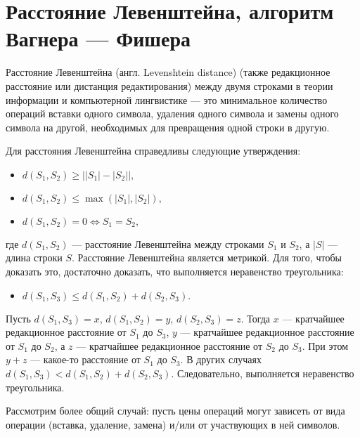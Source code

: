 \section{Расстояние Левенштейна, алгоритм Вагнера --- Фишера}

\begin{definition}
    Расстояние Левенштейна (англ. Levenshtein distance) (также редакционное расстояние или дистанция редактирования) между двумя строками в теории информации и компьютерной лингвистике --- это минимальное количество операций вставки одного символа, удаления одного символа и замены одного символа на другой, необходимых для превращения одной строки в другую.
\end{definition}

Для расстояния Левенштейна справедливы следующие утверждения:

\begin{itemize}
    \item $d(S_1,S_2) \ge \big||S_1|-|S_2| \big|,$
    \item $d(S_1,S_2) \le \max(|S_1|,|S_2|),$
    \item $d(S_1,S_2)=0 \Leftrightarrow S_1=S_2,$
\end{itemize}

где $d(S_1,S_2)$ --- расстояние Левенштейна между строками $S_1$ и $S_2$, а $|S|$ --- длина строки $S$.
Расстояние Левенштейна является метрикой. Для того, чтобы доказать это, достаточно доказать, что выполняется неравенство треугольника:
\begin{itemize}
    \item $d(S_1,S_3) \le d(S_1,S_2) + d(S_2,S_3).$
\end{itemize}

Пусть $d(S_1,S_3) = x$, $d(S_1,S_2) = y$, $d(S_2,S_3) = z$.
Тогда $x$ --- кратчайшее редакционное расстояние от $S_1$ до $S_3$, $y$ --- кратчайшее редакционное расстояние от $S_1$ до $S_2$, а $z$ --- кратчайшее редакционное расстояние от $S_2$ до $S_3$.
При этом $y+z$ --- какое-то расстояние от $S_1$ до $S_3$.
В других случаях $d(S_1,S_3) < d(S_1,S_2) + d(S_2,S_3).$
Следовательно, выполняется неравенство треугольника.

Рассмотрим более общий случай: пусть цены операций могут зависеть от вида операции (вставка, удаление, замена) и/или от участвующих в ней символов.

